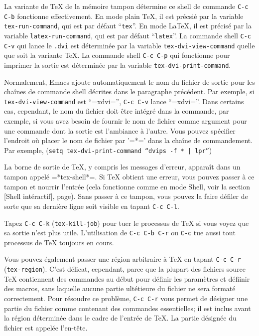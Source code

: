 La variante de \TeX{} de la mémoire tampon détermine ce shell de
commande \texttt{C-c C-b} fonctionne effectivement. En mode plain
\TeX{}, il est précsié par la variable \texttt{tex-run-command}, qui
est par défaut ``\texttt{tex}''. En mode \LaTeX{}, il est précisé par
la variable \texttt{latex-run-command}, qui
est par défaut ``\texttt{latex}''. La commande shell \texttt{C-c C-v}
qui lance le \texttt{.dvi} est déterminée par la variable
\texttt{tex-dvi-view-command} quelle que soit la variante \TeX{}. La
commande shell \texttt{C-c C-p} qui fonctionne pour imprimer la sortie
est déterminée par la variable \texttt{tex-dvi-print-command}. 

Normalement, Emacs ajoute automatiquement le nom du fichier de sortie
pour les chaînes de commande shell décrites dans le paragraphe
précédent. Par exemple, si \texttt{tex-dvi-view-command} est
``=xdvi='', \texttt{C-c C-v} lance ``=xdvi=''. Dans certains cas,
cependant, le nom du fichier doit être intégré dans la commande, par
exemple, si vous avez besoin de fournir le nom de fichier comme
argument pour une commande dont la sortie est l'ambiance à
l'autre. Vous pouvez spécifier l'endroit où placer le nom de fichier
par '=*=' dans la chaîne de commandement. Par exemple, (\texttt{setq
  tex-dvi-print-command ``dvips -f * | lpr''})

La borne de sortie de \TeX{}, y compris les messages d'erreur,
apparaît dans un tampon appelé =*tex-shell*=. Si \TeX{} obtient une
erreur, vous pouvez passer à ce tampon et nourrir l'entrée (cela
fonctionne comme en mode Shell, voir la section
[Shell intéractif], page). Sans passer à ce tampon,
vous pouvez la faire défiler de sorte que sa dernière ligne soit
visible en tapant \texttt{C-c C-l}.

Tapez \texttt{C-c C-k} (\texttt{tex-kill-job}) pour tuer le processus
de \TeX{} si vous voyez que sa sortie n'est plus utile. L'utilisation
de \texttt{C-c C-b C-r} ou \texttt{C-c} tue aussi tout processus de
\TeX{} toujours en cours.

Vous pouvez également passer une région arbitraire à \TeX{} en tapant
\texttt{C-c C-r} (\texttt{tex-region}). C'est délicat, cependant,
parce que la plupart des fichiers source \TeX{} contiennent des
commandes au début pour définir les paramètres et défiinir des macros,
sans laquelle aucune partie ultétieure du fichier ne sera formaté
correctement. Pour résoudre ce problème, \texttt{C-c C-r} vous permet
de désigner une partie du fichier comme contenant des commandes
essentielles; il est inclus avant la région déterminée dans le cadre
de l'entrée de \TeX{}. La partie désignée du fichier est appelée
l'en-tête.

